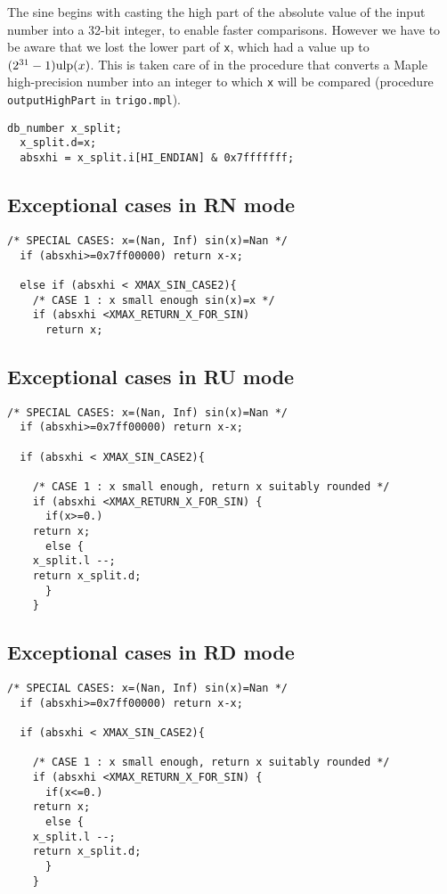 The sine begins with casting the high part of the absolute value of
the input number into a 32-bit integer, to enable faster comparisons.
However we have to be aware that we lost the lower part of \texttt{x},
which had a value up to $(2^{31}-1)\mbox{ulp}(x)$. This is taken care of in
the procedure that converts a Maple high-precision number into an
integer to which \texttt{x} will be compared (procedure
\texttt{outputHighPart} in \texttt{trigo.mpl}).

\begin{lstlisting}[caption={Casting to an int for faster comparisons},firstnumber=1]
  db_number x_split;
  x_split.d=x;
  absxhi = x_split.i[HI_ENDIAN] & 0x7fffffff;
\end{lstlisting}


\subsection{Exceptional cases in RN mode}
\begin{lstlisting}[caption={Exceptional cases for sine RN},firstnumber=1]
  /* SPECIAL CASES: x=(Nan, Inf) sin(x)=Nan */
  if (absxhi>=0x7ff00000) return x-x;    
   
  else if (absxhi < XMAX_SIN_CASE2){
    /* CASE 1 : x small enough sin(x)=x */
    if (absxhi <XMAX_RETURN_X_FOR_SIN)
      return x;
\end{lstlisting}

\subsection{Exceptional cases in RU mode}
\begin{lstlisting}[caption={Exceptional cases for sine RU},firstnumber=1]
  /* SPECIAL CASES: x=(Nan, Inf) sin(x)=Nan */
  if (absxhi>=0x7ff00000) return x-x;    
  
  if (absxhi < XMAX_SIN_CASE2){

    /* CASE 1 : x small enough, return x suitably rounded */
    if (absxhi <XMAX_RETURN_X_FOR_SIN) {
      if(x>=0.)
	return x;
      else {
	x_split.l --;
	return x_split.d;
      }
    }
\end{lstlisting}
\subsection{Exceptional cases in RD mode}
\begin{lstlisting}[caption={Exceptional cases for sine RD},firstnumber=1]
  /* SPECIAL CASES: x=(Nan, Inf) sin(x)=Nan */
  if (absxhi>=0x7ff00000) return x-x;    
  
  if (absxhi < XMAX_SIN_CASE2){

    /* CASE 1 : x small enough, return x suitably rounded */
    if (absxhi <XMAX_RETURN_X_FOR_SIN) {
      if(x<=0.)
	return x;
      else {
	x_split.l --;
	return x_split.d;
      }
    }
\end{lstlisting}
